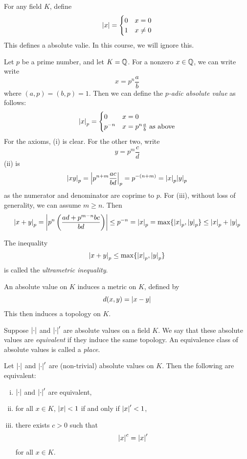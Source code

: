 \documentclass{article}
\begin{document}
\begin{example}
    For any field \(K\), define
    \[\abs{x} = \begin{cases}
        0 & x = 0 \\
        1 & x\ne 0
    \end{cases}\]
    This defines a absolute valie. In this course, we will ignore this.
\end{example}

\begin{example}
    \label{ex:p-adic}
    Let \(p\) be a prime number, and let \(K = \mathbb{Q}\). For a nonzero \(x \in \mathbb{Q}\), we can write write
    \[x = p^n\frac{a}{b}\]
    where \((a, p) = (b, p) = 1\). Then we can define the \emph{\(p\)-adic absolute value} as follows:
    \[\abs{x}_p = \begin{cases}
        0 & x = 0 \\
        p^{-n} & x = p^n \frac{a}{b} \text{ as above}
    \end{cases}\]
    For the axioms, (i) is clear. For the other two, write
    \[y= p^m \frac{c}{d}\]
    (ii) is
    \[\abs{xy}_p = \abs{p^{n+m}\frac{ac}{bd}}_p = p^{-(n+m)} = \abs{x}_p\abs{y}_p\]
    as the numerator and denominator are coprime to \(p\).
    For (iii), without loss of generality, we can assume \(m \ge n\). Then
    \[\abs{x + y}_p = \abs{p^n \left(\frac{ad + p^{m-n}bc}{bd}\right)} \le p^{-n} = \abs{x}_p = \max\{\abs{x}_p, \abs{y}_p\} \le \abs{x}_p + \abs{y}_p\]

    The inequality \[\abs{x + y}_p \le \max\{\abs{x}_p, \abs{y}_p\}\] is called the \emph{ultrametric inequality}.
\end{example}

An absolute value on \(K\) induces a metric on \(K\), defined by
\[d(x, y) = \abs{x-y}\]
This then induces a topology on \(K\).

\begin{definition}
     Suppose \(\abs{\cdot}\) and \(\abs{\cdot}'\) are absolute values on a field \(K\). We say that these absolute values are \emph{equivalent} if they induce the same topology. An equivalence class of absolute values is called a \emph{place}.
\end{definition}

\begin{proposition}
    Let \(\abs{\cdot}\) and \(\abs{\cdot}'\) are (non-trivial) absolute values on \(K\). Then the following are equivalent:
    \begin{enumerate}[(i)]
        \item \(\abs{\cdot}\) and \(\abs{\cdot}'\) are equivalent,
        \item for all \(x \in K\), \(\abs{x} < 1\) if and only if \(\abs{x}' < 1\),
        \item there exists \(c > 0\) such that
        \[\abs{x}^c = \abs{x}'\]
        for all \(x \in K\).
    \end{enumerate}
\end{proposition}
\end{document}

